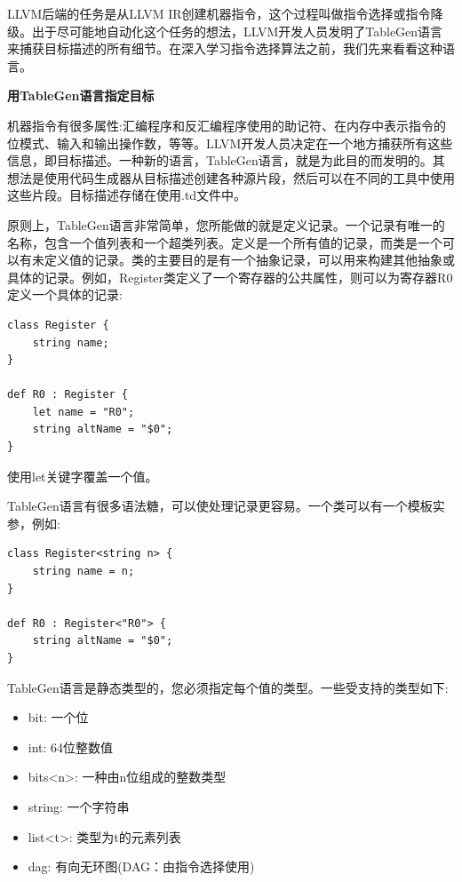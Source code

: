 
LLVM后端的任务是从LLVM IR创建机器指令，这个过程叫做指令选择或指令降级。出于尽可能地自动化这个任务的想法，LLVM开发人员发明了TableGen语言来捕获目标描述的所有细节。在深入学习指令选择算法之前，我们先来看看这种语言。\par

\hspace*{\fill} \par %
\textbf{用TableGen语言指定目标}

机器指令有很多属性:汇编程序和反汇编程序使用的助记符、在内存中表示指令的位模式、输入和输出操作数，等等。LLVM开发人员决定在一个地方捕获所有这些信息，即目标描述。一种新的语言，TableGen语言，就是为此目的而发明的。其想法是使用代码生成器从目标描述创建各种源片段，然后可以在不同的工具中使用这些片段。目标描述存储在使用.td文件中。\par

原则上，TableGen语言非常简单，您所能做的就是定义记录。一个记录有唯一的名称，包含一个值列表和一个超类列表。定义是一个所有值的记录，而类是一个可以有未定义值的记录。类的主要目的是有一个抽象记录，可以用来构建其他抽象或具体的记录。例如，Register类定义了一个寄存器的公共属性，则可以为寄存器R0定义一个具体的记录:\par

\begin{lstlisting}[caption={}]
class Register {
	string name;
}

def R0 : Register {
	let name = "R0";
	string altName = "$0";
}
\end{lstlisting}

使用let关键字覆盖一个值。\par

TableGen语言有很多语法糖，可以使处理记录更容易。一个类可以有一个模板实参，例如:\par

\begin{lstlisting}[caption={}]
class Register<string n> {
	string name = n;
}

def R0 : Register<"R0"> {
	string altName = "$0";
}
\end{lstlisting}

TableGen语言是静态类型的，您必须指定每个值的类型。一些受支持的类型如下:\par

\begin{itemize}
\item bit: 一个位
\item int: 64位整数值
\item bits<n>: 一种由n位组成的整数类型
\item string: 一个字符串
\item list<t>: 类型为t的元素列表
\item dag: 有向无环图(DAG：由指令选择使用)
\end{itemize}

